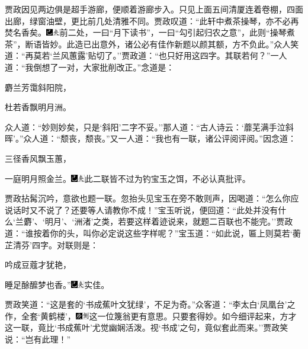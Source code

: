贾政因见两边俱是超手游廊，便顺着游廊步入。只见上面五间清厦连着卷棚，四面出廊，绿窗油壁，更比前几处清雅不同。贾政叹道：``此轩中煮茶操琴，亦不必再焚名香矣。{\includegraphics[width=3mm]{../Images/00003}\includegraphics[width=3mm]{../Images/00012}\footnotesize \kaishu 前二处，一曰``月下读书''，一曰``勾引起归农之意''，此则``操琴煮茶''，断语皆妙。}此造已出意外，诸公必有佳作新题以颜其额，方不负此。''众人笑道：``再莫若`兰风蕙露'贴切了。''贾政道：``也只好用这四字。其联若何？''一人道：``我倒想了一对，大家批削改正。''念道是：

麝兰芳霭斜阳院，

杜若香飘明月洲。

众人道：``妙则妙矣，只是`斜阳'二字不妥。''那人道：``古人诗云：`蘼芜满手泣斜晖'。''众人道：``颓丧，颓丧。''又一人道：``我也有一联，诸公评阅评阅。''因念道：

三径香风飘玉蕙，

一庭明月照金兰。{\includegraphics[width=3mm]{../Images/00003}\includegraphics[width=3mm]{../Images/00012}\footnotesize \kaishu 此二联皆不过为钓宝玉之饵，不必认真批评。}

贾政拈髯沉吟，意欲也题一联。忽抬头见宝玉在旁不敢则声，因喝道：``怎么你应说话时又不说了？还要等人请教你不成！''宝玉听说，便回道：``此处并没有什么`兰麝'、`明月'、`洲渚'之类，若要这样着迹说来，就题二百联也不能完。''贾政道：``谁按着你的头，叫你必定说这些字样呢？''宝玉道：``如此说，匾上则莫若`蘅芷清芬'四字。对联则是：

吟成豆蔻才犹艳，

睡足酴醿梦也香。''{\includegraphics[width=3mm]{../Images/00003}\includegraphics[width=3mm]{../Images/00012}\footnotesize \kaishu 实佳。}

贾政笑道：``这是套的`书成蕉叶文犹绿'，不足为奇。''众客道：``李太白`凤凰台'之作，全套`黄鹤楼'，{\includegraphics[width=3mm]{../Images/00004}\includegraphics[width=3mm]{../Images/00011}\footnotesize \kaishu 这一位篾翁更有意思。}只要套得妙。如今细评起来，方才这一联，竟比`书成蕉叶'尤觉幽娴活泼。视`书成'之句，竟似套此而来。''贾政笑说：``岂有此理！''

